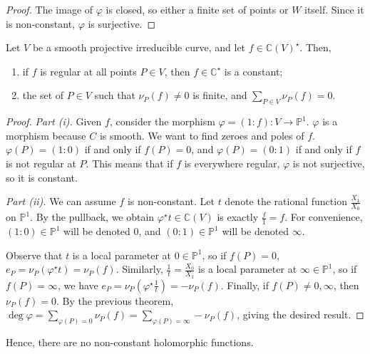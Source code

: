 \begin{proof}
    The image of \( \varphi \) is closed, so either a finite set of points or \( W \) itself.
    Since it is non-constant, \( \varphi \) is surjective.
\end{proof}
\begin{corollary}
    Let \( V \) be a smooth projective irreducible curve, and let \( f \in \mathbb C(V)^\star \).
    Then,
    \begin{enumerate}
        \item if \( f \) is regular at all points \( P \in V \), then \( f \in \mathbb C^\star \) is a constant;
        \item the set of \( P \in V \) such that \( \nu_P(f) \neq 0 \) is finite, and \( \sum_{P \in V} \nu_P(f) = 0 \).
    \end{enumerate}
\end{corollary}
\begin{proof}
    \emph{Part (i).}
    Given \( f \), consider the morphism \( \varphi = (1 : f) \colon V \to \mathbb P^1 \).
    \( \varphi \) is a morphism because \( C \) is smooth.
    We want to find zeroes and poles of \( f \).
    \( \varphi(P) = (1:0) \) if and only if \( f(P) = 0 \), and \( \varphi(P) = (0:1) \) if and only if \( f \) is not regular at \( P \).
    This means that if \( f \) is everywhere regular, \( \varphi \) is not surjective, so it is constant.

    \emph{Part (ii).}
    We can assume \( f \) is non-constant.
    Let \( t \) denote the rational function \( \frac{X_1}{X_0} \) on \( \mathbb P^1 \).
    By the pullback, we obtain \( \varphi^\star t \in \mathbb C(V) \) is exactly \( \frac{f}{1} = f \).
    For convenience, \( (1:0) \in \mathbb P^1 \) will be denoted 0, and \( (0:1) \in \mathbb P^1 \) will be denoted \( \infty \).

    Observe that \( t \) is a local parameter at \( 0 \in \mathbb P^1 \), so if \( f(P) = 0 \), \( e_P = \nu_P(\varphi^\star t) = \nu_P(f) \).
    Similarly, \( \frac{1}{t} = \frac{X_0}{X_1} \) is a local parameter at \( \infty \in \mathbb P^1 \), so if \( f(P) = \infty \), we have \( e_P = \nu_P(\varphi^\star \frac{1}{t}) = -\nu_P(f) \).
    Finally, if \( f(P) \neq 0, \infty \), then \( \nu_P(f) = 0 \).
    By the previous theorem, \( \deg \varphi = \sum_{\varphi(P) = 0} \nu_P(f) = \sum_{\varphi(P) = \infty} -\nu_P(f) \), giving the desired result.
\end{proof}
Hence, there are no non-constant holomorphic functions.

